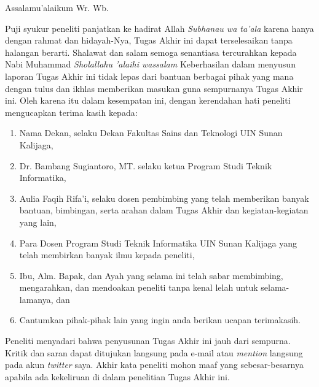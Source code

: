 \documentclass{tif-uin-suka}
\def \writerlabel{peneliti}
\def \writerlabelCap{Peneliti}
\begin{document}
\cover

\approvalpage
\restoregeometry

\preface
Assalamu'alaikum Wr. Wb.

\vspace{0.5cm}

Puji syukur {\writerlabel} panjatkan ke hadirat Allah \textit{Subhanau wa ta'ala} karena hanya dengan rahmat dan hidayah-Nya, Tugas Akhir ini dapat terselesaikan tanpa halangan berarti. Shalawat dan salam semoga senantiasa tercurahkan kepada Nabi Muhammad \textit{Sholallahu 'alaihi wassalam} Keberhasilan dalam menyusun laporan Tugas Akhir ini tidak lepas dari bantuan berbagai pihak yang mana dengan tulus dan ikhlas memberikan masukan guna sempurnanya Tugas Akhir ini. Oleh karena itu dalam kesempatan ini, dengan kerendahan hati {\writerlabel} mengucapkan terima kasih kepada:

\begin{enumerate}
\item{Nama Dekan, selaku Dekan Fakultas Sains dan Teknologi UIN Sunan Kalijaga,}
\item{Dr. Bambang Sugiantoro, MT. selaku ketua Program Studi Teknik Informatika,}
\item{Aulia Faqih Rifa'i, selaku dosen pembimbing yang telah memberikan banyak bantuan, bimbingan, serta arahan dalam Tugas Akhir dan kegiatan-kegiatan yang lain,}
\item{Para Dosen Program Studi Teknik Informatika UIN Sunan Kalijaga yang telah membirkan banyak ilmu kepada {\writerlabel},}
\item{Ibu, Alm. Bapak, dan Ayah yang selama ini telah sabar membimbing, mengarahkan, dan mendoakan {\writerlabel} tanpa kenal lelah untuk selama-lamanya, dan}
\item{Cantumkan pihak-pihak lain yang ingin anda berikan ucapan terimakasih.}
\end{enumerate}

{\writerlabelCap} menyadari bahwa penyusunan Tugas Akhir ini jauh dari sempurna. Kritik dan saran dapat ditujukan langsung pada e-mail atau \emph{mention} langsung pada akun \emph{twitter} saya. Akhir kata {\writerlabel} mohon maaf yang sebesar-besarnya apabila ada kekeliruan di dalam {\writerlabel}an Tugas Akhir ini.

\vspace{0.5cm}
\end{document}
